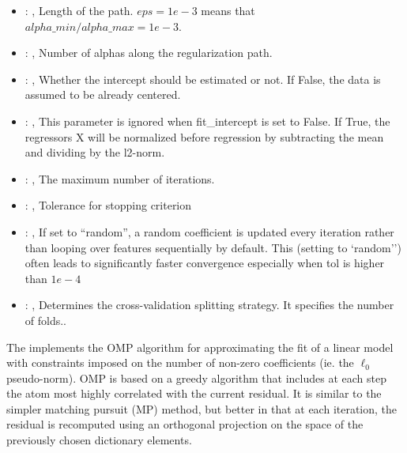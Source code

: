 \begin{itemize}
    \item {}: , 
      Length of the path. $eps=1e-3$ means that $alpha\_min / alpha\_max = 1e-3$.

    \item {}: , 
      Number of alphas along the regularization path.

    \item {}: , 
      Whether the intercept should be estimated or not. If False,
      the data is assumed to be already centered.

    \item {}: , 
      This parameter is ignored when fit\_intercept is set to False. If True,
      the regressors X will be normalized before regression by subtracting the mean and
      dividing by the l2-norm.

    \item {}: , 
      The maximum number of iterations.

    \item {}: , 
      Tolerance for stopping criterion

    \item {}: , 
      If set to ``random'', a random coefficient is updated every iteration
      rather than looping over features sequentially by default. This (setting to `random'')
      often leads to significantly faster convergence especially when tol is higher than $1e-4$

    \item {}: , 
      Determines the cross-validation splitting strategy.
      It specifies the number of folds..
  \end{itemize}
 The                          implements the OMP algorithm for
 approximating the fit of a                         linear model with constraints imposed on the
 number of non-zero                         coefficients (ie. the $\ell_0$ pseudo-norm). OMP is
 based on a greedy                         algorithm that includes at each step the atom most highly
 correlated                         with the current residual. It is similar to the simpler matching
 pursuit (MP) method, but better in that at each iteration, the residual                         is
 recomputed using an orthogonal projection on the space of the                         previously
 chosen dictionary elements.


